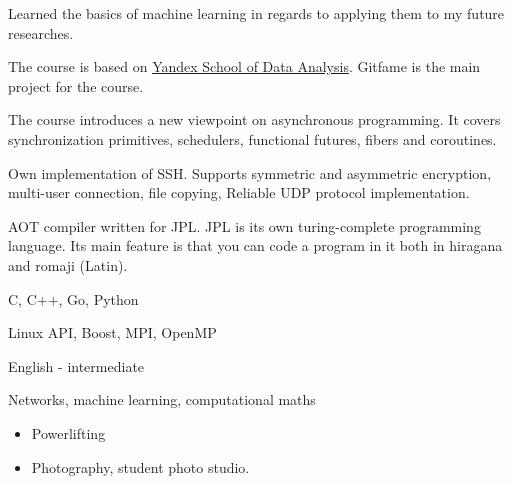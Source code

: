 
Learned the basics of machine learning in regards to applying them to my future researches.
\medskip

The course is based on \href{https://shad.yandex.ru}{Yandex School of Data Analysis}. Gitfame is the main project for the course.
\medskip

The course introduces a new viewpoint on asynchronous programming.
It covers synchronization primitives, schedulers, functional futures, fibers and coroutines.
\medskip

Own implementation of SSH. Supports symmetric and asymmetric encryption, multi-user connection, file copying, Reliable UDP protocol implementation.
\medskip

AOT compiler written for JPL. JPL is its own turing-complete programming language.
Its main feature is that you can code a program in it both in hiragana and romaji (Latin).

\divider

C, C++, Go, Python
\medskip

Linux API, Boost, MPI, OpenMP
\medskip

English - intermediate
\medskip

Networks, machine learning, computational maths

\divider

\begin{itemize}
    \item Powerlifting
    \item Photography, student photo studio.
\end{itemize}

\divider


